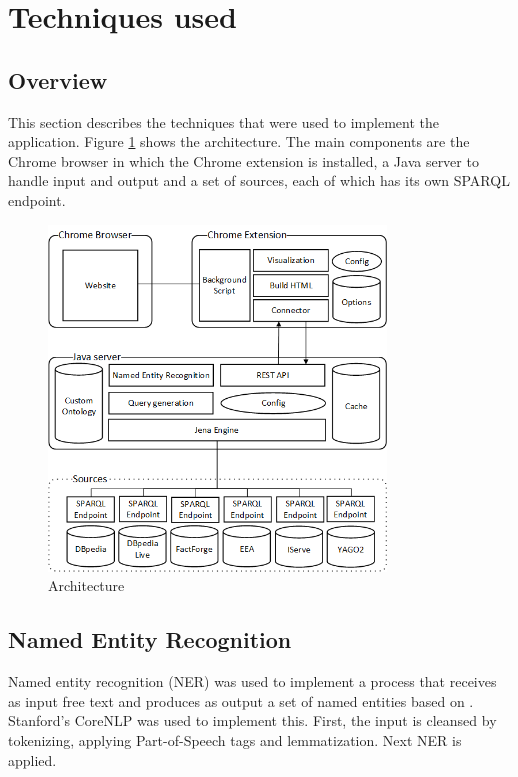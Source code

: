 \section{Techniques used} 

\subsection{Overview}
This section describes the techniques that were used to implement the application. Figure \ref{fig:architecture} shows the architecture. The main components are the Chrome browser in which the Chrome extension is installed, a Java server to handle input and output and a set of sources, each of which has its own SPARQL endpoint. 


\begin{figure}[ht]
	\centering
	\includegraphics[width=0.8\textwidth]{img/Architecture_v2}
	\caption{Architecture}
	\label{fig:architecture}
\end{figure}


%


\subsection{Named Entity Recognition}
Named entity recognition (NER) was used to implement a process that receives as input free text and produces as output a set of named entities based on \cite{NERTutorial}. Stanford's CoreNLP \cite{CoreNLP_NER} was used to implement this. First, the input is cleansed by tokenizing, applying Part-of-Speech tags and lemmatization. Next NER is applied. %

